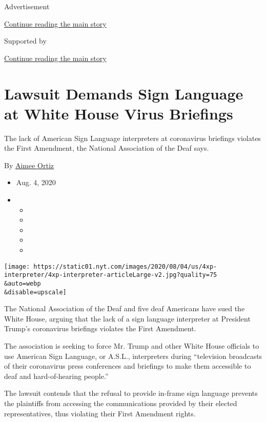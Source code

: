Advertisement

\protect\hyperlink{after-top}{Continue reading the main story}

Supported by

\protect\hyperlink{after-sponsor}{Continue reading the main story}

\hypertarget{lawsuit-demands-sign-language-at-white-house-virus-briefings}{%
\section{Lawsuit Demands Sign Language at White House Virus
Briefings}\label{lawsuit-demands-sign-language-at-white-house-virus-briefings}}

The lack of American Sign Language interpreters at coronavirus briefings
violates the First Amendment, the National Association of the Deaf says.

By \href{https://www.nytimes.com/by/aimee-ortiz}{Aimee Ortiz}

\begin{itemize}
\item
  Aug. 4, 2020
\item
  \begin{itemize}
  \item
  \item
  \item
  \item
  \item
  \end{itemize}
\end{itemize}

\texttt{[image: https://static01.nyt.com/images/2020/08/04/us/4xp-interpreter/4xp-interpreter-articleLarge-v2.jpg?quality=75\\\&auto=webp\\\&disable=upscale]}

The National Association of the Deaf and five deaf Americans have sued
the White House, arguing that the lack of a sign language interpreter at
President Trump's coronavirus briefings violates the First Amendment.

The association is seeking to force Mr. Trump and other White House
officials to use American Sign Language, or A.S.L., interpreters during
``television broadcasts of their coronavirus press conferences and
briefings to make them accessible to deaf and hard-of-hearing people.''

The lawsuit contends that the refusal to provide in-frame sign language
prevents the plaintiffs from accessing the communications provided by
their elected representatives, thus violating their First Amendment
rights.

